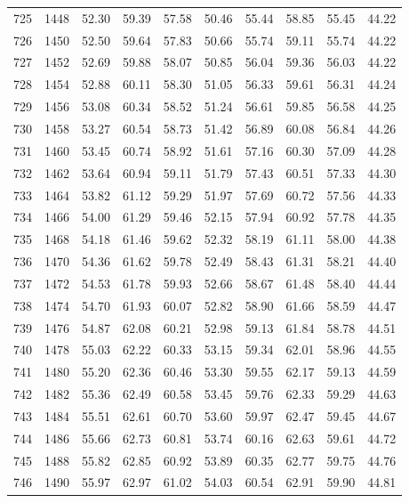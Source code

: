 \begin{longtable}{rrllllllll}
		725 & 1448 & 52.30 & 59.39 & 57.58 & 50.46 & 55.44 & 58.85 & 55.45 & 44.22 \\ 
		726 & 1450 & 52.50 & 59.64 & 57.83 & 50.66 & 55.74 & 59.11 & 55.74 & 44.22 \\ 
		727 & 1452 & 52.69 & 59.88 & 58.07 & 50.85 & 56.04 & 59.36 & 56.03 & 44.22 \\ 
		728 & 1454 & 52.88 & 60.11 & 58.30 & 51.05 & 56.33 & 59.61 & 56.31 & 44.24 \\ 
		729 & 1456 & 53.08 & 60.34 & 58.52 & 51.24 & 56.61 & 59.85 & 56.58 & 44.25 \\ 
		730 & 1458 & 53.27 & 60.54 & 58.73 & 51.42 & 56.89 & 60.08 & 56.84 & 44.26 \\ 
		731 & 1460 & 53.45 & 60.74 & 58.92 & 51.61 & 57.16 & 60.30 & 57.09 & 44.28 \\ 
		732 & 1462 & 53.64 & 60.94 & 59.11 & 51.79 & 57.43 & 60.51 & 57.33 & 44.30 \\ 
		733 & 1464 & 53.82 & 61.12 & 59.29 & 51.97 & 57.69 & 60.72 & 57.56 & 44.33 \\ 
		734 & 1466 & 54.00 & 61.29 & 59.46 & 52.15 & 57.94 & 60.92 & 57.78 & 44.35 \\ 
		735 & 1468 & 54.18 & 61.46 & 59.62 & 52.32 & 58.19 & 61.11 & 58.00 & 44.38 \\ 
		736 & 1470 & 54.36 & 61.62 & 59.78 & 52.49 & 58.43 & 61.31 & 58.21 & 44.40 \\ 
		737 & 1472 & 54.53 & 61.78 & 59.93 & 52.66 & 58.67 & 61.48 & 58.40 & 44.44 \\ 
		738 & 1474 & 54.70 & 61.93 & 60.07 & 52.82 & 58.90 & 61.66 & 58.59 & 44.47 \\ 
		739 & 1476 & 54.87 & 62.08 & 60.21 & 52.98 & 59.13 & 61.84 & 58.78 & 44.51 \\ 
		740 & 1478 & 55.03 & 62.22 & 60.33 & 53.15 & 59.34 & 62.01 & 58.96 & 44.55 \\ 
		741 & 1480 & 55.20 & 62.36 & 60.46 & 53.30 & 59.55 & 62.17 & 59.13 & 44.59 \\ 
		742 & 1482 & 55.36 & 62.49 & 60.58 & 53.45 & 59.76 & 62.33 & 59.29 & 44.63 \\ 
		743 & 1484 & 55.51 & 62.61 & 60.70 & 53.60 & 59.97 & 62.47 & 59.45 & 44.67 \\ 
		744 & 1486 & 55.66 & 62.73 & 60.81 & 53.74 & 60.16 & 62.63 & 59.61 & 44.72 \\ 
		745 & 1488 & 55.82 & 62.85 & 60.92 & 53.89 & 60.35 & 62.77 & 59.75 & 44.76 \\ 
		746 & 1490 & 55.97 & 62.97 & 61.02 & 54.03 & 60.54 & 62.91 & 59.90 & 44.81 \\ 

\end{longtable}
